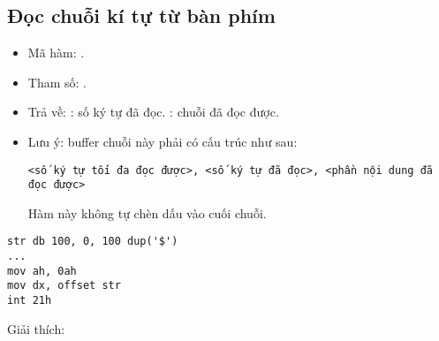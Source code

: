 \documentclass[main.tex]{subfiles}
\begin{document}
\subsection{Đọc chuỗi kí tự từ bàn phím} \label{subsec:docchuoi}
\begin{itemize}
    \item Mã hàm: .
    \item Tham số: .
    \item Trả về: \cd{[DX+1]}: số ký tự đã đọc. \cd{[DX+2]}: chuỗi đã đọc được.
    \item Lưu ý: buffer chuỗi này phải có cấu trúc như sau:
    \begin{verbatim}
<số ký tự tối đa đọc được>, <số ký tự đã đọc>, <phần nội dung đã đọc được>
    \end{verbatim}
    \par Hàm này không tự chèn dấu  vào cuối chuỗi.
\end{itemize}
\begin{verbatim}
str db 100, 0, 100 dup('$')
...
mov ah, 0ah 
mov dx, offset str 
int 21h
\end{verbatim}
Giải thích:
\end{document}
